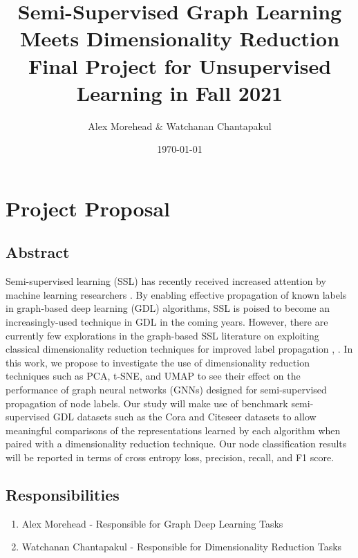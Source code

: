\documentclass[11pt]{article}
\author{Alex Morehead \& Watchanan Chantapakul}
\date{\today}
\title{Semi-Supervised Graph Learning Meets Dimensionality Reduction\\\medskip
\large Final Project for Unsupervised Learning in Fall 2021}
\begin{document}
\maketitle

\section{Project Proposal}
\label{sec:orgf6f8df7}
\subsection{Abstract}
\label{sec:org0b0f742}
Semi-supervised learning (SSL) has recently received increased attention by
machine learning researchers \cite{DBLP:journals/corr/KipfW16}. By enabling
effective propagation of known labels in graph-based deep learning (GDL)
algorithms, SSL is poised to become an increasingly-used technique in GDL in the
coming years. However, there are currently few explorations in the graph-based
SSL literature on exploiting classical dimensionality reduction techniques for
improved label propagation \cite{YU20121119}, \cite{hong2019learning}. In this work,
we propose to investigate the use of dimensionality reduction techniques such as
PCA, t-SNE, and UMAP to see their effect on the performance of graph neural
networks (GNNs) designed for semi-supervised propagation of node labels. Our
study will make use of benchmark semi-supervised GDL datasets such as the Cora
and Citeseer datasets to allow meaningful comparisons of the representations
learned by each algorithm when paired with a dimensionality reduction technique.
Our node classification results will be reported in terms of cross entropy loss,
precision, recall, and F1 score.
\subsection{Responsibilities}
\label{sec:orgf7e3d93}
\begin{enumerate}
\item Alex Morehead - Responsible for Graph Deep Learning Tasks
\item Watchanan Chantapakul - Responsible for Dimensionality Reduction Tasks
\end{enumerate}
\end{document}
